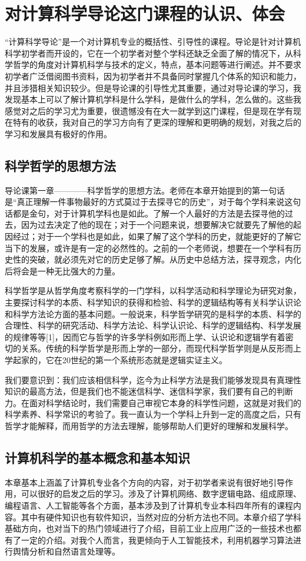 \documentclass{article}
\begin{document}
\section{对计算科学导论这门课程的认识、体会}
“计算科学导论”是一个对计算机专业的概括性、引导性的课程。导论是针对计算机科学初学者而开设的，它在一个初学者对整个学科还缺乏全面了解的情况下，从科学哲学的角度对计算机科学与技术的定义，特点，基本问题等进行阐述。并不要求初学者广泛借阅图书资料，因为初学者并不具备同时掌握几个体系的知识和能力，并且涉猎相关知识较少。但是导论课的引导性尤其重要，通过对导论课的学习，我发现基本上可以了解计算机学科是什么学科，是做什么的学科，怎么做的。这些我感觉对之后的学习尤为重要，很遗憾没有在大一就学到这门课程，但是现在学有现在特有的收获，我对自己的学习方向有了更深的理解和更明确的规划，对我之后的学习和发展具有极好的作用。\par

\subsection{科学哲学的思想方法}
导论课第一章————科学哲学的思想方法。老师在本章开始提到的第一句话是“真正理解一件事物最好的方式莫过于去探寻它的历史”，对于每个学科来说这句话都是金句，对于计算机学科也是如此。了解一个人最好的方法是去探寻他的过去，因为过去决定了他的现在；对于一个问题来说，想要解决它就要先了解他的起因经过；对于一个学科也是如此，如果了解了这个学科的历史，就能更好的了解它当下的发展，或许是有一定的必然性的。之前的一个老师说，想要在一个学科有历史性的突破，就必须先对它的历史足够了解。从历史中总结方法，探寻观念，内化后将会是一种无比强大的力量。

科学哲学是从哲学角度考察科学的一门学科，以科学活动和科学理论为研究对象，主要探讨科学的本质、科学知识的获得和检验、科学的逻辑结构等有关科学认识论和科学方法论方面的基本问题。一般说来，科学哲学研究的是科学的本质、科学的合理性、科学的研究活动、科学方法论、科学认识论、科学的逻辑结构、科学发展的规律等等[1]，因而它与哲学的许多学科例如形而上学、认识论和逻辑学有着密切的关系。传统的科学哲学是形而上学的一部分，而现代科学哲学则是从反形而上学起家的，它在20世纪的第一个系统形态就是逻辑实证主义。

我们要意识到：我们应该相信科学，迄今为止科学方法是我们能够发现具有真理性知识的最高方法，但是我们也不能迷信科学、迷信科学家，我们要有自己的判断力。在面对科学结论时，我们需要自己审视它本身的科学性问题，这就是对我们的科学素养、科学常识的考验了。我一直认为一个学科上升到一定的高度之后，只有哲学才能解释，而用哲学的方法去理解，能够帮助人们更好的理解和发展科学。

\subsection{计算机科学的基本概念和基本知识}
本章基本上涵盖了计算机专业各个方向的内容，对于初学者来说有很好地引导作用，可以很好的启发之后的学习。涉及了计算机网络、数字逻辑电路、组成原理、编程语言、人工智能等各个方面，基本涉及到了计算机专业本科四年所有的课程内容。其中有硬件知识也有软件知识，当然对应的分析方法也不同。本章介绍了学科基础方向，也对当下的热门领域进行了介绍，目前工业上应用广泛的一些技术也都有了一定的介绍。对我个人而言，我更倾向于人工智能技术，利用机器学习算法进行舆情分析和自然语言处理等。
\end{document}
